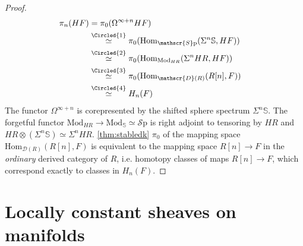 \documentclass[10pt]{amsart}
\newcommand{\D}{\mathscr{D}}
\newcommand{\bS}{\mathbb{S}}
\newcommand{\Hom}{\mathrm{Hom}}
\newcommand{\Sp}{\mathscr{S}\mathrm{p}}
\newcommand{\Mod}{\mathrm{Mod}}
\theoremstyle{definition}
\theoremstyle{remark}
\numberwithin{equation}{section}
\begin{document}
\begin{proof}
  \begin{align*}
    \pi_n(HF) & =\pi_0(\Omega^{\infty+n}HF)\\
    & \overset{\Circled{1}}{\simeq} \pi_0(\Hom_{\Sp}(\Sigma^n\bS,HF)) \\
    & \overset{\Circled{2}}{\simeq} \pi_0(\Hom_{\Mod_{HR}}(\Sigma^n HR,HF)) & \\
    & \overset{\Circled{3}}{\simeq} \pi_0(\Hom_{\D(R)}(R[n],F))\\
    & \overset{\Circled{4}}{\simeq} H_n(F)
  \end{align*}  The functor $\Omega^{\infty+n}$ is corepresented by the shifted sphere spectrum $\Sigma^n\bS$.  The forgetful functor $\Mod_{HR}\to\Mod_\bS\simeq\Sp$ is right adjoint to tensoring by $HR$ and $HR\otimes(\Sigma^n\bS)\simeq \Sigma^nHR$.  \cref{thm:stabledk}  $\pi_0$ of the mapping space $\Hom_{\D(R)}(R[n],F)$ is equivalent to the mapping space $R[n]\to F$ in the \emph{ordinary} derived category of $R$, i.e. homotopy classes of maps $R[n]\to F$, which correspond exactly to classes in $H_n(F)$.
\end{proof}

\section{Locally constant sheaves on manifolds}\label{sec:constant sheaves}
\end{document}
